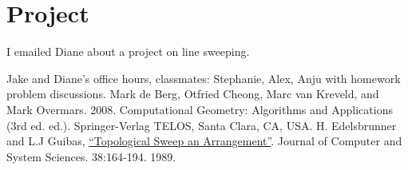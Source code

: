 \documentclass [12pt]{article}
\begin{document}
    \pagebreak



    \section{Project}
    \label{sec:four}

    I emailed Diane about a project on line sweeping.

       
    
        




    




\begin{thebibliography}{1}
    Jake and Diane's office hours, classmates: Stephanie, Alex, Anju with homework problem discussions.
    Mark de Berg, Otfried Cheong, Marc van Kreveld, and Mark Overmars. 2008. Computational Geometry: Algorithms and Applications (3rd ed. ed.). Springer-Verlag TELOS, Santa Clara, CA, USA.
    H. Edelsbrunner and L.J Guibas, \href{https://www.sciencedirect.com/science/article/pii/002200008990038X}{``Topological Sweep an Arrangement''}. Journal of Computer and System Sciences. 38:164-194. 1989.
\end{thebibliography}
\end{document}
